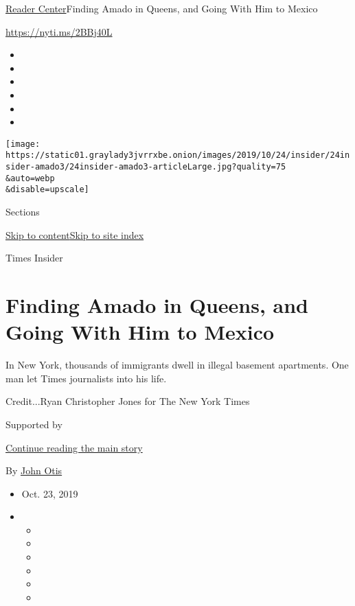 \href{/section/reader-center}{Reader Center}\textbar{}Finding Amado in
Queens, and Going With Him to Mexico

\url{https://nyti.ms/2BBj40L}

\begin{itemize}
\item
\item
\item
\item
\item
\item
\end{itemize}

\texttt{[image: https://static01.graylady3jvrrxbe.onion/images/2019/10/24/insider/24insider-amado3/24insider-amado3-articleLarge.jpg?quality=75\\\&auto=webp\\\&disable=upscale]}

Sections

\protect\hyperlink{site-content}{Skip to
content}\protect\hyperlink{site-index}{Skip to site index}

Times Insider

\hypertarget{finding-amado-in-queens-and-going-with-him-to-mexico}{%
\section{Finding Amado in Queens, and Going With Him to
Mexico}\label{finding-amado-in-queens-and-going-with-him-to-mexico}}

In New York, thousands of immigrants dwell in illegal basement
apartments. One man let Times journalists into his life.

Credit...Ryan Christopher Jones for The New York Times

Supported by

\protect\hyperlink{after-sponsor}{Continue reading the main story}

By \href{https://www.nytimes3xbfgragh.onion/by/john-otis}{John Otis}

\begin{itemize}
\item
  Oct. 23, 2019
\item
  \begin{itemize}
  \item
  \item
  \item
  \item
  \item
  \item
  \end{itemize}
\end{itemize}

